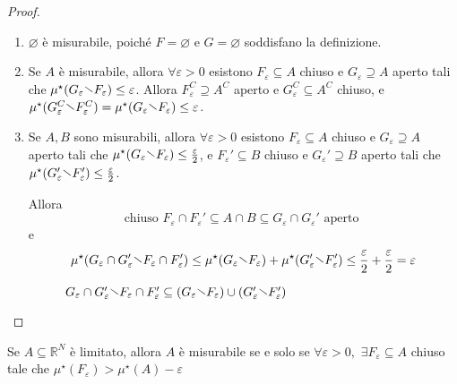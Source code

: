 \begin{proof}
\begin{enumerate}[label = \arabic*.]
    \item \(\varnothing\) è misurabile, poiché \(F = \varnothing\) e \(G =
        \varnothing\) soddisfano la definizione.
    \item Se \(A\) è misurabile, allora \(\forall \varepsilon >0\) esistono \(F_{\varepsilon} \subseteq A
        \) chiuso e \(G_{\varepsilon} \supseteq A \) aperto tali che
        \(\mu^\star(G_{\varepsilon} \sminus F_{\varepsilon}) \le \varepsilon\).
        Allora \(F_{\varepsilon}^{C} \supseteq  A^{C} \) aperto e \(G_{\varepsilon}^{C}
        \subseteq A^{C} \) chiuso, e \(\mu^\star(G_{\varepsilon}^{C} \sminus
        F_{\varepsilon}^{C}) = \mu^\star(G_{\varepsilon} \sminus
        F_{\varepsilon}) \le \varepsilon\).
    \item Se \(A, B\) sono misurabili, allora \(\forall \varepsilon > 0\)
        esistono \(F_{\varepsilon} \subseteq A \) chiuso e \(G_{\varepsilon}
        \supseteq A \) aperto tali che \(\mu^\star(G_{\varepsilon} \sminus
        F_{\varepsilon}) \le \frac{\varepsilon}{2}\), e \(F_{\varepsilon}' \subseteq B \)
        chiuso e \(G_{\varepsilon}' \supseteq B \) aperto tali che
        \(\mu^\star(G_{\varepsilon}' \sminus F_{\varepsilon}') \le
        \frac{\varepsilon}{2}\).

        Allora
        \[
            \text{chiuso } F_\varepsilon \cap F_\varepsilon' \subseteq A \cap B \subseteq
            G_\varepsilon \cap G_\varepsilon' \text{ aperto }
        \]
        e
        \[
            \mu^\star(G_\varepsilon \cap G_\varepsilon' \sminus F_\varepsilon \cap F_\varepsilon') \le
            \mu^\star(G_\varepsilon \sminus F_\varepsilon) + \mu^\star(G_\varepsilon' \sminus F_\varepsilon') \le
            \frac{\varepsilon}{2} + \frac{\varepsilon}{2} = \varepsilon
        \]
\begin{figure}[ht]
    \centering
    \caption{\(G_\varepsilon \cap G_\varepsilon' \sminus F_\varepsilon \cap
    F_\varepsilon' \subseteq (G_\varepsilon \sminus F_\varepsilon) \cup
(G_\varepsilon' \sminus F_\varepsilon') \) }\label{fig:weird_intersection}
\end{figure}

\end{enumerate}
\end{proof}
\begin{proposition}\label{prop:prop_5}
    Se \(A\subseteq \mathbb{R}^{N} \) è limitato, allora \(A\) è misurabile se e
    solo se \(\forall \varepsilon > 0, \,\, \exists F_\varepsilon \subseteq A \)
    chiuso tale che \(\mu^\star(F_\varepsilon) > \mu^\star(A) - \varepsilon\) 
\end{proposition}

